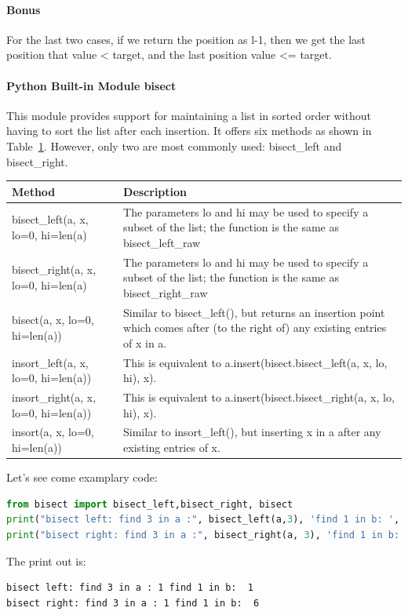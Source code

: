 \documentclass[../searching.tex]{subfiles}
\begin{document}
\paragraph{Bonus} For the last two cases, if we return the position as l-1, then we get the last position that value < target, and the last position value <= target.

\paragraph{Python Built-in Module bisect} This module provides support for maintaining a list in sorted order without having to sort the list after each insertion. It offers six methods as shown in Table~\ref{tab:method_bisect}. However, only two are most commonly used: bisect\_left and bisect\_right.
\begin{table}[h]
\begin{small}
\centering
\noindent{}
 \noindent \begin{tabular}{|p{}|p{}| }
  \hline
Method & Description   \\ \hline
bisect\_left(a, x, lo=0, hi=len(a)  &  The parameters lo and hi may be used to specify a subset of the list; the function is the same as bisect\_left\_raw  \\\hline
bisect\_right(a, x, lo=0, hi=len(a)  &  The parameters lo and hi may be used to specify a subset of the list; the function is the same as bisect\_right\_raw  \\\hline
bisect(a, x, lo=0, hi=len(a))  &Similar to bisect\_left(), but returns an insertion point which comes after (to the right of) any existing entries of x in a.\\ \hline
insort\_left(a, x, lo=0, hi=len(a))  &This is equivalent to a.insert(bisect.bisect\_left(a, x, lo, hi), x).\\ \hline
insort\_right(a, x, lo=0, hi=len(a)) & This is equivalent to a.insert(bisect.bisect\_right(a, x, lo, hi), x).\\ \hline
insort(a, x, lo=0, hi=len(a)) & Similar to insort\_left(), but inserting x in a after any existing entries of x.\\ \hline
\end{tabular}
  \label{tab:method_bisect}
  \end{small}
\end{table} 
Let's see come examplary code:
\begin{lstlisting}[language=Python]
from bisect import bisect_left,bisect_right, bisect
print("bisect left: find 3 in a :", bisect_left(a,3), 'find 1 in b: ', bisect_left(b, 1)) # lower_bound, the first position that value>= target
print("bisect right: find 3 in a :", bisect_right(a, 3), 'find 1 in b: ', bisect_right(b, 1)) # upper_bound, the last position that value <= target
\end{lstlisting}
The print out is:
\begin{lstlisting}
bisect left: find 3 in a : 1 find 1 in b:  1
bisect right: find 3 in a : 1 find 1 in b:  6
\end{lstlisting}
\end{document}
